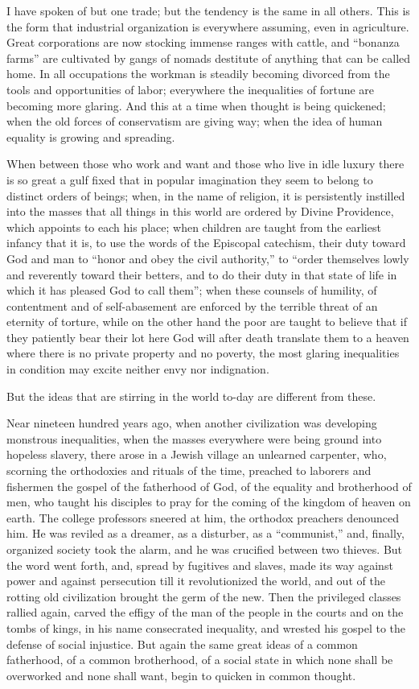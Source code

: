 \documentclass{book}
\begin{document}
I have spoken of but one trade; but the tendency is the same in all others. This is the form that industrial organization is everywhere assuming, even in agriculture. Great corporations are now stocking immense ranges with cattle, and “bonanza farms” are cultivated by gangs of nomads destitute of anything that can be called home. In all occupations the workman is steadily becoming divorced from the tools and opportunities of labor; everywhere the inequalities of fortune are becoming more glaring. And this at a time when thought is being quickened; when the old forces of conservatism are giving way; when the idea of human equality is growing and spreading.

When between those who work and want and those who live in idle luxury there is so great a gulf fixed that in popular imagination they seem to belong to distinct orders of beings; when, in the name of religion, it is persistently instilled into the masses that all things in this world are ordered by Divine Providence, which appoints to each his place; when children are taught from the earliest infancy that it is, to use the words of the Episcopal catechism, their duty toward God and man to “honor and obey the civil authority,” to “order themselves lowly and reverently toward their betters, and to do their duty in that state of life in which it has pleased God to call them”; when these counsels of humility, of contentment and of self-abasement are enforced by the terrible threat of an eternity of torture, while on the other hand the poor are taught to believe that if they patiently bear their lot here God will after death translate them to a heaven where there is no private property and no poverty, the most glaring inequalities in condition may excite neither envy nor indignation.

But the ideas that are stirring in the world to-day are different from these.

Near nineteen hundred years ago, when another civilization was developing monstrous inequalities, when the masses everywhere were being ground into hopeless slavery, there arose in a Jewish village an unlearned carpenter, who, scorning the orthodoxies and rituals of the time, preached to laborers and fishermen the gospel of the fatherhood of God, of the equality and brotherhood of men, who taught his disciples to pray for the coming of the kingdom of heaven on earth. The college professors sneered at him, the orthodox preachers denounced him. He was reviled as a dreamer, as a disturber, as a “communist,” and, finally, organized society took the alarm, and he was crucified between two thieves. But the word went forth, and, spread by fugitives and slaves, made its way against power and against persecution till it revolutionized the world, and out of the rotting old civilization brought the germ of the new. Then the privileged classes rallied again, carved the effigy of the man of the people in the courts and on the tombs of kings, in his name consecrated inequality, and wrested his gospel to the defense of social injustice. But again the same great ideas of a common fatherhood, of a common brotherhood, of a social state in which none shall be overworked and none shall want, begin to quicken in common thought.
\end{document}
